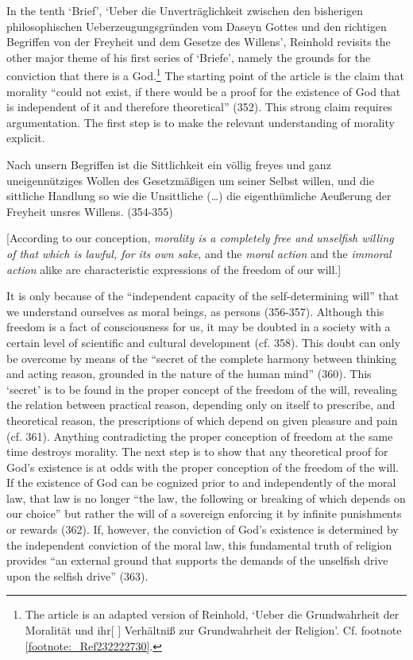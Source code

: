 In the tenth `Brief', `Ueber die Unvertr\"{a}glichkeit zwischen den bisherigen philosophischen Ueberzeugungsgr\"{u}nden vom Daseyn Gottes und den richtigen Begriffen von der Freyheit und dem Gesetze des Willens', Reinhold revisits the other major theme of his first series of `Briefe', namely the grounds for the conviction that there is a God.\footnote{ The article is an adapted version of Reinhold, `Ueber die Grundwahrheit der Moralit\"{a}t und ihr[ ] Verh\"{a}ltni\ss{} zur Grundwahrheit der Religion'. Cf. footnote \ref{footnote:_Ref232222730}. } The starting point of the article is the claim that morality ``could not exist, if there would be a proof for the existence of God that is independent of it and therefore theoretical'' (352). This strong claim requires argumentation. The first step is to make the relevant understanding of morality explicit. 

Nach unsern Begriffen ist die Sittlichkeit ein v\"{o}llig freyes und ganz uneigenn\"{u}tziges Wollen des Gesetzm\"{a}\ss{}igen um seiner Selbst willen, und die sittliche Handlung so wie die Unsittliche (\ldots ) die eigenth\"{u}mliche Aeu\ss{}erung der Freyheit unsres Willens. (354{-}355)

[According to our conception, \textit{morality is a completely free and unselfish willing of that which is lawful, for its own sake}, and the \textit{moral action} and the \textit{immoral action} alike are characteristic expressions of the freedom of our will.] 

It is only because of the ``independent capacity of the self{-}determining will'' that we understand ourselves as moral beings, as persons (356{-}357). Although this freedom is a fact of consciousness for us, it may be doubted in a society with a certain level of scientific and cultural development (cf. 358). This doubt can only be overcome by means of the ``secret of the complete harmony between thinking and acting reason, grounded in the nature of the human mind'' (360). This `secret' is to be found in the proper concept of the freedom of the will, revealing the relation between practical reason, depending only on itself to prescribe, and theoretical reason, the prescriptions of which depend on given pleasure and pain (cf. 361). Anything contradicting the proper conception of freedom at the same time destroys morality. The next step is to show that any theoretical proof for God's existence is at odds with the proper conception of the freedom of the will. If the existence of God can be cognized prior to and independently of the moral law, that law is no longer ``the law, the following or breaking of which depends on our choice'' but rather the will of a sovereign enforcing it by infinite punishments or rewards (362). If, however, the conviction of God's existence is determined by the independent conviction of the moral law, this fundamental truth of religion provides ``an external ground that supports the demands of the unselfish drive upon the selfish drive'' (363). 

